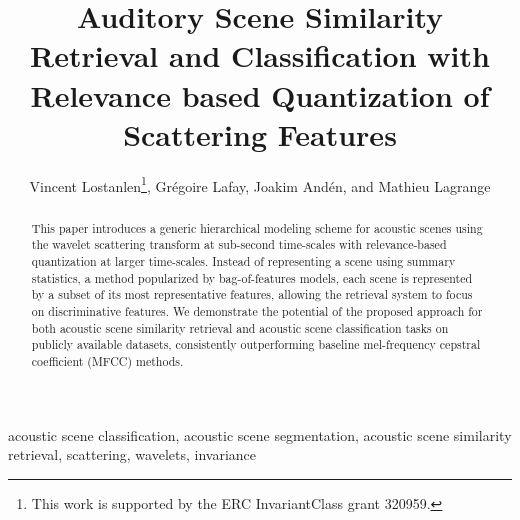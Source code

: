 \documentclass[journal]{IEEEtran}
\begin{document}
%
\title{Auditory Scene Similarity Retrieval and Classification with Relevance based Quantization of Scattering Features}

\author{Vincent Lostanlen\thanks{This work is supported by the ERC InvariantClass grant 320959.}, Gr\'egoire Lafay, Joakim And\'en, and Mathieu Lagrange}


\maketitle

\begin{abstract}

This paper introduces a generic hierarchical modeling scheme for acoustic scenes using the wavelet scattering transform at sub-second time-scales with relevance-based quantization at larger time-scales. Instead of representing a scene using summary statistics, a method popularized by bag-of-features models, each scene is represented by a subset of its most representative features, allowing the retrieval system to focus on discriminative features. We demonstrate the potential of the proposed approach for both acoustic scene similarity retrieval and acoustic scene classification tasks on publicly available datasets, consistently outperforming baseline mel-frequency cepstral coefficient (MFCC) methods.

\end{abstract}

\begin{IEEEkeywords}
acoustic scene classification, acoustic scene segmentation, acoustic scene similarity retrieval, scattering, wavelets, invariance
\end{IEEEkeywords}

%
\IEEEpeerreviewmaketitle
\end{document}
